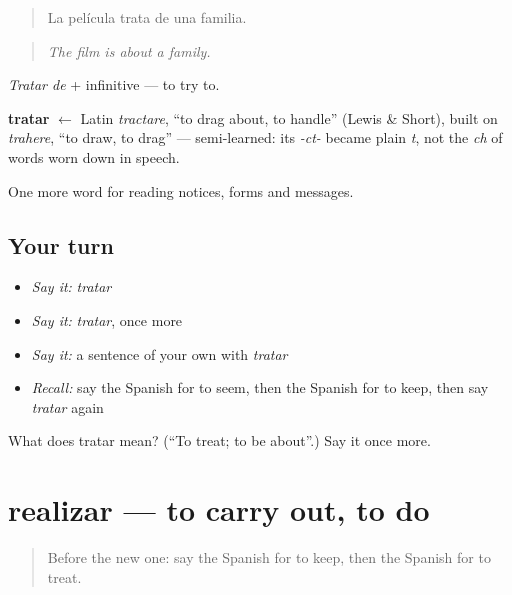 \begin{quote}
La película trata de una familia.
\end{quote}

\begin{quote}
\emph{The film is about a family.}
\end{quote}

\emph{Tratar de} + infinitive — to try to.

\begin{cousinweb}
\textbf{tratar} $\leftarrow$ Latin \emph{tractare}, \textquotedblleft{}to drag about, to handle\textquotedblright{} (Lewis \& Short), built on \emph{trahere}, \textquotedblleft{}to draw, to drag\textquotedblright{} — semi-learned: its \emph{-ct-} became plain \emph{t}, not the \emph{ch} of words worn down in speech.
\end{cousinweb}

\begin{grammarlens}[title={What you've built}]
One more word for reading notices, forms and messages.
\end{grammarlens}

\subsection*{Your turn}
\begin{itemize}
\raggedright
  \item \emph{Say it:} \emph{tratar}
  \item \emph{Say it:} \emph{tratar}, once more
  \item \emph{Say it:} a sentence of your own with \emph{tratar}
  \item \emph{Recall:} say the Spanish for to seem, then the Spanish for to keep, then say \emph{tratar} again
\end{itemize}

\begin{tcolorbox}[breakable,colback=teal!4,colframe=teal!35!black,title={Before you move on}]
What does tratar mean? (\textquotedblleft{}To treat; to be about\textquotedblright{}.) Say it once more.
\end{tcolorbox}
\section[realizar]{realizar — to carry out, to do}

\label{lesson:ES-C511-realizar}



\begin{quote}
Before the new one: say the Spanish for to keep, then the Spanish for to treat.
\end{quote}

